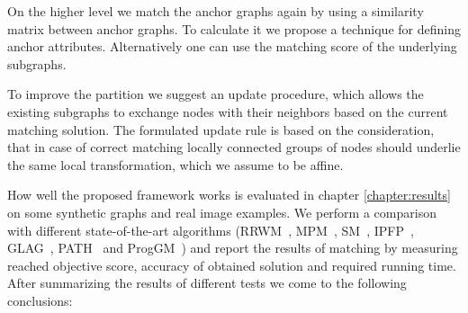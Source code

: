 On the higher level we match the anchor graphs again by using a similarity matrix between anchor graphs. To calculate it we propose a technique for defining anchor attributes. Alternatively one can use the matching score of the underlying subgraphs. 

To improve the partition we suggest an update procedure, which allows the existing subgraphs to exchange nodes with their neighbors based on the current matching solution. The formulated update rule is based on the consideration, that in case of correct matching locally connected groups of nodes should underlie the same local transformation, which we assume to be affine.

How well the proposed framework works is evaluated in chapter \ref{chapter:results} on some synthetic graphs and real image examples. We perform a comparison with different state-of-the-art algorithms (RRWM~\cite{Cho2010_RRWM}, MPM~\cite{Cho2014_Haystack}, SM~\cite{Leordeanu2005_SM}, IPFP~\cite{Leordeanu2009_IPFP}, GLAG~\cite{Fiori2013_GLAG}, PATH~\cite{Zazlavskiy2008_PATH} and ProgGM~\cite{Cho2012_ProgressiveGM}) and report the results of matching by measuring reached objective score, accuracy of obtained solution and required running time. After summarizing the results of different tests we come to the following conclusions:

